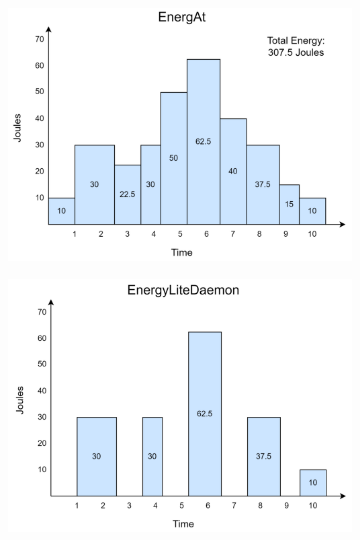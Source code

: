 \documentclass[times, 10pt,twocolumn]{article}
\begin{document}
\begin{figure}[ht] %
   \centering
   \begin{subfigure}[b]{0.24\textwidth} %
         \centering
         \includegraphics[width=\textwidth]{imgs/EnergAt_Energy.png}
         \caption{}
         \label{fig:a}
   \end{subfigure}
   \hfill
   \begin{subfigure}[b]{0.24\textwidth} %
         \centering
         \includegraphics[width=\textwidth]{imgs/EnergyLiteDaemon_Energy_1.png}
         \caption{}
         \label{fig:b}
   \end{subfigure}
   \hfill
   \begin{subfigure}[b]{0.24\textwidth} %

\end{subfigure}
\end{figure}
\end{document}
